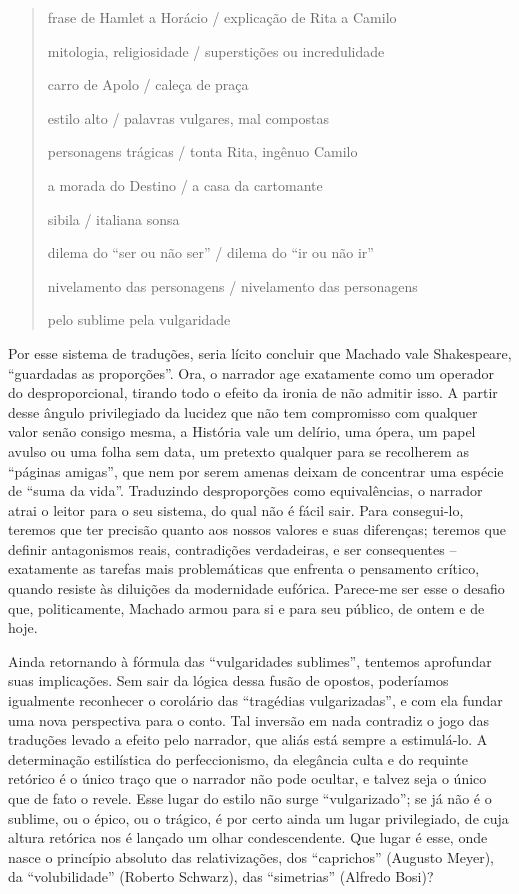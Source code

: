\begin{quote}
frase de Hamlet a Horácio / explicação de Rita a Camilo

mitologia, religiosidade / superstições ou incredulidade

carro de Apolo / caleça de praça

estilo alto / palavras vulgares, mal compostas

personagens trágicas / tonta Rita, ingênuo Camilo

a morada do Destino / a casa da cartomante

sibila / italiana sonsa

dilema do ``ser ou não ser'' / dilema do ``ir ou não ir''

nivelamento das personagens / nivelamento das personagens

pelo sublime pela vulgaridade
\end{quote}

Por esse sistema de traduções, seria lícito concluir que Machado vale
Shakespeare, ``guardadas as proporções''. Ora, o narrador age exatamente
como um operador do desproporcional, tirando todo o efeito da ironia de
não admitir isso. A partir desse ângulo privilegiado da lucidez que não
tem compromisso com qualquer valor senão consigo mesma, a História vale
um delírio, uma ópera, um papel avulso ou uma folha sem data, um
pretexto qualquer para se recolherem as ``páginas amigas'', que nem por
serem amenas deixam de concentrar uma espécie de ``suma da vida''.
Traduzindo desproporções como equivalências, o narrador atrai o leitor
para o seu sistema, do qual não é fácil sair. Para consegui-lo, teremos
que ter precisão quanto aos nossos valores e suas diferenças; teremos
que definir antagonismos reais, contradições verdadeiras, e ser
consequentes -- exatamente as tarefas mais problemáticas que enfrenta o
pensamento crítico, quando resiste às diluições da modernidade eufórica.
Parece-me ser esse o desafio que, politicamente, Machado armou para si e
para seu público, de ontem e de hoje.

Ainda retornando à fórmula das ``vulgaridades sublimes'', tentemos
aprofundar suas implicações. Sem sair da lógica dessa fusão de opostos,
poderíamos igualmente reconhecer o corolário das ``tragédias
vulgarizadas'', e com ela fundar uma nova perspectiva para o conto. Tal
inversão em nada contradiz o jogo das traduções levado a efeito pelo
narrador, que aliás está sempre a estimulá-lo. A determinação
estilística do perfeccionismo, da elegância culta e do requinte retórico
é o único traço que o narrador não pode ocultar, e talvez seja o único
que de fato o revele. Esse lugar do estilo não surge ``vulgarizado''; se
já não é o sublime, ou o épico, ou o trágico, é por certo ainda um lugar
privilegiado, de cuja altura retórica nos é lançado um olhar
condescendente. Que lugar é esse, onde nasce o princípio absoluto das
relativizações, dos ``caprichos'' (Augusto Meyer), da ``volubilidade''
(Roberto Schwarz), das ``simetrias'' (Alfredo Bosi)?


